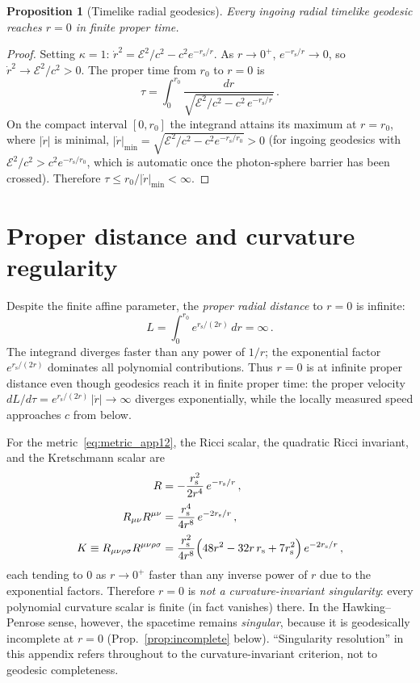 \documentclass[11pt]{article}
\newcommand{\rs}{r_{\mathrm{s}}}
\newtheorem{proposition}{Proposition}
\begin{document}
\begin{proposition}[Timelike radial geodesics]\label{prop:time}
Every ingoing radial timelike geodesic
reaches $r = 0$ in finite proper time.
\end{proposition}
\begin{proof}
Setting $\kappa = 1$:
$\dot{r}^{2} = \mathcal{E}^{2}/c^{2} - c^{2}e^{-\rs/r}$.
As $r \to 0^{+}$, $e^{-\rs/r} \to 0$, so
$\dot{r}^{2} \to \mathcal{E}^{2}/c^{2} > 0$.
The proper time from $r_{0}$ to $r = 0$ is
\[
  \tau = \int_{0}^{r_{0}}
  \frac{dr}{\sqrt{\mathcal{E}^{2}/c^{2}
  - c^{2}\,e^{-\rs/r}}}\,.
\]
On the compact interval $[0,r_{0}]$ the integrand attains its
maximum at $r=r_{0}$, where $|\dot{r}|$ is minimal,
$|\dot{r}|_{\min}=\sqrt{\mathcal{E}^{2}/c^{2}-c^{2}e^{-\rs/r_{0}}}>0$
(for ingoing geodesics with $\mathcal{E}^{2}/c^{2}>c^{2}e^{-\rs/r_{0}}$,
which is automatic once the photon-sphere barrier has been crossed).
Therefore $\tau\leq r_{0}/|\dot{r}|_{\min}<\infty$.
\end{proof}


\section{Proper distance and curvature regularity}
\label{sec:regularity}

Despite the finite affine parameter, the
\emph{proper radial distance} to $r = 0$ is infinite:
\begin{equation}\label{eq:proper_distance}
  L = \int_{0}^{r_{0}} e^{\rs/(2r)}\,dr = \infty\,.
\end{equation}
The integrand diverges faster than any power of
$1/r$; the exponential factor $e^{\rs/(2r)}$
dominates all polynomial contributions.
Thus $r = 0$ is at infinite proper distance even
though geodesics reach it in finite proper
time: the proper velocity
$dL/d\tau = e^{\rs/(2r)}\,|\dot{r}| \to \infty$
diverges exponentially, while the locally measured
speed approaches $c$ from below.

For the metric~\eqref{eq:metric_app12}, the Ricci scalar, the
quadratic Ricci invariant, and the Kretschmann scalar are
\begin{equation}\label{eq:curvature}
  \begin{aligned}
  R &= -\frac{\rs^{2}}{2r^{4}}\,e^{-\rs/r}\,,\\[2pt]
  R_{\mu\nu}R^{\mu\nu}
  &= \frac{\rs^{4}}{4r^{8}}\,e^{-2\rs/r}\,,\\[2pt]
  K \equiv R_{\mu\nu\rho\sigma}R^{\mu\nu\rho\sigma}
  &= \frac{\rs^{2}}{4r^{8}}\Bigl(48r^{2}-32r\,\rs+7\rs^{2}\Bigr)\,
     e^{-2\rs/r}\,,
  \end{aligned}
\end{equation}
each tending to $0$ as $r\to 0^{+}$ faster than any inverse power of
$r$ due to the exponential factors.  Therefore $r=0$ is \emph{not a
curvature-invariant singularity}: every polynomial curvature scalar is
finite (in fact vanishes) there.  In the Hawking--Penrose sense,
however, the spacetime remains \emph{singular}, because it is
geodesically incomplete at $r=0$ (Prop.~\ref{prop:incomplete} below).
``Singularity resolution'' in this appendix refers throughout to the
curvature-invariant criterion, not to geodesic completeness.
\end{document}
